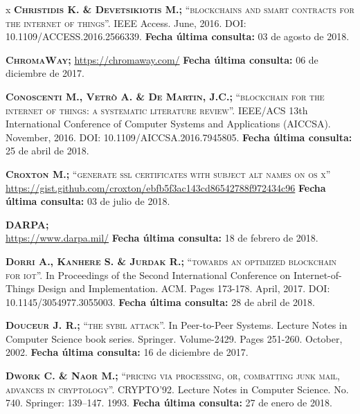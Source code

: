 \begin{thebibliography} {x}
	 \textsc{\textbf{Christidis K. \& Devetsikiotis M.; }}\textsc{“blockchains and smart contracts for the internet of things”.} IEEE Access. June, 2016. DOI: 10.1109/ACCESS.2016.2566339. 
	\newline \textbf{Fecha última consulta:} 03 de agosto de 2018.
	
	 \textsc{\textbf{ChromaWay; }} 
	\url{https://chromaway.com/}
	\newline \textbf{Fecha última consulta:} 06 de diciembre de 2017.
	
	 \textsc{\textbf{Conoscenti M., Vetrò A. \& De Martin, J.C.; }}\textsc{“blockchain for the internet of things: a systematic literature review”.} IEEE/ACS 13th International Conference of Computer Systems and Applications (AICCSA). November, 2016. DOI: 10.1109/AICCSA.2016.7945805.
	\newline \textbf{Fecha última consulta:} 25 de abril de 2018.
	
	 \textsc{\textbf{Croxton M.; }}\textsc{“generate ssl certificates with subject alt names on os x”} \\ 
	\url{https://gist.github.com/croxton/ebfb5f3ac143cd86542788f972434c96}
	\newline \textbf{Fecha última consulta:} 03 de julio de 2018.
		
	 \textsc{\textbf{DARPA; }} \\ 
	\url{https://www.darpa.mil/}
	\newline \textbf{Fecha última consulta:} 18 de febrero de 2018.
		
	 \textsc{\textbf{Dorri A., Kanhere S. \& Jurdak R.; }}\textsc{“towards an optimized blockchain for iot”.} In Proceedings of the Second International Conference on Internet-of-Things Design and Implementation. ACM. Pages 173-178. April, 2017. DOI: 10.1145/3054977.3055003.
	\newline \textbf{Fecha última consulta:} 28 de abril de 2018.
		
	 \textsc{\textbf{Douceur J. R.; }} \textsc{“the sybil attack”.} In Peer-to-Peer Systems. Lecture Notes in Computer Science book series. Springer. Volume-2429. Pages 251-260. October, 2002.
	\newline \textbf{Fecha última consulta:} 16 de diciembre de 2017.

	 \textsc{\textbf{Dwork C. \& Naor M.; }}\textsc{“pricing via processing, or, combatting junk mail, advances in cryptology”.} CRYPTO’92. Lecture Notes in Computer Science. No. 740. Springer: 139–147. 1993. 
	\newline \textbf{Fecha última consulta:} 27 de enero de 2018.
	

\end{thebibliography}
